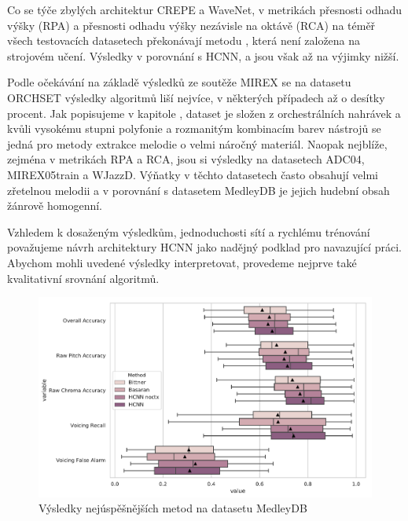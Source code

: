Co se týče zbylých architektur CREPE a WaveNet, v metrikách přesnosti odhadu výšky (RPA) a přesnosti odhadu výšky nezávisle na oktávě (RCA) na téměř všech testovacích datasetech překonávají metodu \cite{Salamon2012a}, která není založena na strojovém učení. Výsledky v porovnání s HCNN, \cite{Bittner2017} a \cite{DBasaranSEssid2018} jsou však až na výjimky nižší.

Podle očekávání na základě výsledků ze soutěže MIREX se na datasetu ORCHSET výsledky algoritmů liší nejvíce, v některých případech až o desítky procent. Jak popisujeme v kapitole , dataset je složen z orchestrálních nahrávek a kvůli vysokému stupni polyfonie a rozmanitým kombinacím barev nástrojů se jedná pro metody extrakce melodie o velmi náročný materiál. Naopak nejblíže, zejména v metrikách RPA a RCA, jsou si výsledky na datasetech ADC04, MIREX05train a WJazzD. Výňatky v těchto datasetech často obsahují velmi zřetelnou melodii a v porovnání s datasetem MedleyDB je jejich hudební obsah žánrově homogenní.

Vzhledem k dosaženým výsledkům, jednoduchosti sítí a rychlému trénování považujeme návrh architektury HCNN jako nadějný podklad pro navazující práci. Abychom mohli uvedené výsledky interpretovat, provedeme nejprve také kvalitativní srovnání algoritmů. 


\begin{figure}[h]\centering
\includegraphics[width=\textwidth,height=\textheight,keepaspectratio]{../img/final_medleydb}
\caption{Výsledky nejúspěšnějších metod na datasetu MedleyDB}
\label{obr:final_medleydb}
\end{figure}

